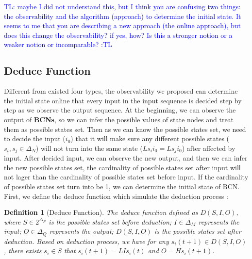 \documentclass[letterpaper, 10 pt, conference]{ieeeconf}  %
\newtheorem{definition}{Definition}
\newcommand{\tl}[1]{\textcolor{blue} {TL: #1 :TL} }
\begin{document}
\tl{maybe I did not understand this, but I think you are confusing two things: the observability and the algorithm (approach) to determine the initial state. It seems to me that you are describing a new approach (the online approach), but does this change the observability? if yes, how? Is this a stronger notion or a weaker notion or incomparable?}
\subsection{Deduce Function}
Different from existed four types, the observability we proposed can determine the initial state online that every input in the input sequence is decided step by step as we observe the output sequence. At the beginning, we can observe the output of {\bf BCNs}, so we can infer the possible values of state nodes and treat them as possible states set. Then as we can know the possible states set, we need to decide the input ($i_0$) that it will make sure any different possible states ($s_i, s_j\in \Delta_N$) will not turn into the same state ($Ls_i i_0=Ls_j i_0$) after affected by input. After decided input, we can observe the new output, and then we can infer the new possible states set, the cardinality of possible states set after input will not lager than the cardinality of possible states set before input. If the cardinality of possible states set turn into be 1, we can determine the initial state of BCN. First, we define the deduce function  which simulate the deduction process :
\begin{definition}[Deduce Function] The deduce function defined as $D\left(S, I, O\right)$, where $S\in 2^{\Delta_N}$ is the possible states set before deduction; $I\in\Delta_M$ represents the input; $O\in\Delta_Q$ represents the output; $D\left(S, I, O\right)$ is the possible states set after deduction. Based on deduction process, we have for any $s_i(t+1)\in D\left(S, I, O\right)$, there exists $s_i\in S$ that $s_i(t+1)=LIs_i(t)$ and $O=Hs_i(t+1)$.
\end{definition}
\end{document}
